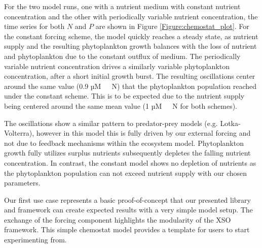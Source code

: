\documentclass[journal abbreviation, manuscript]{copernicus}
\begin{document}
For the two model runs, one with a nutrient medium with constant nutrient concentration and the other with periodically variable nutrient concentration, the time series for both $N$ and $P$ are shown in Figure \ref{Figure:chemostat_plot}.
For the constant forcing scheme, the model quickly reaches a steady state, as nutrient supply and the resulting phytoplankton growth balances with the loss of nutrient and phytoplankton due to the constant outflux of medium.
The periodically variable nutrient concentration drives a similarly variable phytoplankton concentration, after a short initial growth burst. The resulting oscillations center around the same value (0.9 \unit{µM \ N}) that the phytoplankton population reached under the constant scheme. This is to be expected due to the nutrient supply being centered around the same mean value (1 \unit{µM \ N} for both schemes).

The oscillations show a similar pattern to predator-prey models (e.g. Lotka-Volterra), however in this model this is fully driven by our external forcing and not due to feedback mechanisms within the ecosystem model. Phytoplankton growth fully utilizes surplus nutrients subsequently depletes the falling nutrient concentration. In contrast, the constant model shows no depletion of nutrients as the phytoplankton population can not exceed nutrient supply with our chosen parameters.

Our first use case represents a basic proof-of-concept that our presented library and framework can create expected results with a very simple model setup. The exchange of the forcing component highlights the modularity of the XSO framework. This simple chemostat model provides a template for users to start experimenting from.
\end{document}
